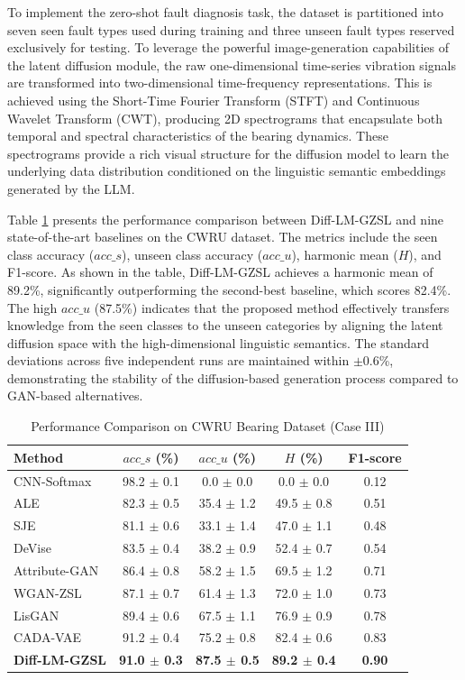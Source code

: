 \documentclass[journal]{IEEEtran}
\begin{document}
To implement the zero-shot fault diagnosis task, the dataset is partitioned into seven seen fault types used during training and three unseen fault types reserved exclusively for testing. To leverage the powerful image-generation capabilities of the latent diffusion module, the raw one-dimensional time-series vibration signals are transformed into two-dimensional time-frequency representations. This is achieved using the Short-Time Fourier Transform (STFT) and Continuous Wavelet Transform (CWT), producing 2D spectrograms that encapsulate both temporal and spectral characteristics of the bearing dynamics. These spectrograms provide a rich visual structure for the diffusion model to learn the underlying data distribution conditioned on the linguistic semantic embeddings generated by the LLM.

Table \ref{tab:cwru_results} presents the performance comparison between Diff-LM-GZSL and nine state-of-the-art baselines on the CWRU dataset. The metrics include the seen class accuracy ($acc\_s$), unseen class accuracy ($acc\_u$), harmonic mean ($H$), and F1-score. As shown in the table, Diff-LM-GZSL achieves a harmonic mean of 89.2\%, significantly outperforming the second-best baseline, which scores 82.4\%. The high $acc\_u$ (87.5\%) indicates that the proposed method effectively transfers knowledge from the seen classes to the unseen categories by aligning the latent diffusion space with the high-dimensional linguistic semantics. The standard deviations across five independent runs are maintained within $\pm$0.6\%, demonstrating the stability of the diffusion-based generation process compared to GAN-based alternatives.

\begin{table}[ht]
\centering
\caption{Performance Comparison on CWRU Bearing Dataset (Case III)}
\label{tab:cwru_results}
\begin{tabular}{lcccc}
\toprule
Method & $acc\_s$ (\%) & $acc\_u$ (\%) & $H$ (\%) & F1-score \\ \midrule
CNN-Softmax & 98.2 $\pm$ 0.1 & 0.0 $\pm$ 0.0 & 0.0 $\pm$ 0.0 & 0.12 \\
ALE & 82.3 $\pm$ 0.5 & 35.4 $\pm$ 1.2 & 49.5 $\pm$ 0.8 & 0.51 \\
SJE & 81.1 $\pm$ 0.6 & 33.1 $\pm$ 1.4 & 47.0 $\pm$ 1.1 & 0.48 \\
DeVise & 83.5 $\pm$ 0.4 & 38.2 $\pm$ 0.9 & 52.4 $\pm$ 0.7 & 0.54 \\
Attribute-GAN & 86.4 $\pm$ 0.8 & 58.2 $\pm$ 1.5 & 69.5 $\pm$ 1.2 & 0.71 \\
WGAN-ZSL & 87.1 $\pm$ 0.7 & 61.4 $\pm$ 1.3 & 72.0 $\pm$ 1.0 & 0.73 \\
LisGAN & 89.4 $\pm$ 0.6 & 67.5 $\pm$ 1.1 & 76.9 $\pm$ 0.9 & 0.78 \\
CADA-VAE & 91.2 $\pm$ 0.4 & 75.2 $\pm$ 0.8 & 82.4 $\pm$ 0.6 & 0.83 \\
\textbf{Diff-LM-GZSL} & \textbf{91.0 $\pm$ 0.3} & \textbf{87.5 $\pm$ 0.5} & \textbf{89.2 $\pm$ 0.4} & \textbf{0.90} \\ \bottomrule
\end{tabular}
\end{table}
\end{document}
